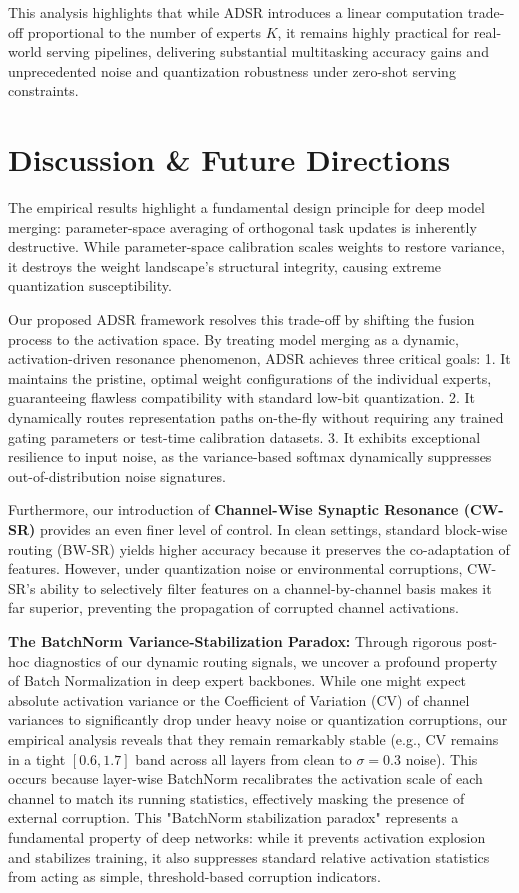 \documentclass{article}
\theoremstyle{plain}
\theoremstyle{definition}
\theoremstyle{remark}
\begin{document}
This analysis highlights that while ADSR introduces a linear computation trade-off proportional to the number of experts $K$, it remains highly practical for real-world serving pipelines, delivering substantial multitasking accuracy gains and unprecedented noise and quantization robustness under zero-shot serving constraints.

\section{Discussion \& Future Directions}
The empirical results highlight a fundamental design principle for deep model merging: parameter-space averaging of orthogonal task updates is inherently destructive. While parameter-space calibration scales weights to restore variance, it destroys the weight landscape's structural integrity, causing extreme quantization susceptibility.

Our proposed ADSR framework resolves this trade-off by shifting the fusion process to the activation space. By treating model merging as a dynamic, activation-driven resonance phenomenon, ADSR achieves three critical goals:
1. It maintains the pristine, optimal weight configurations of the individual experts, guaranteeing flawless compatibility with standard low-bit quantization.
2. It dynamically routes representation paths on-the-fly without requiring any trained gating parameters or test-time calibration datasets.
3. It exhibits exceptional resilience to input noise, as the variance-based softmax dynamically suppresses out-of-distribution noise signatures.

Furthermore, our introduction of \textbf{Channel-Wise Synaptic Resonance (CW-SR)} provides an even finer level of control. In clean settings, standard block-wise routing (BW-SR) yields higher accuracy because it preserves the co-adaptation of features. However, under quantization noise or environmental corruptions, CW-SR's ability to selectively filter features on a channel-by-channel basis makes it far superior, preventing the propagation of corrupted channel activations.

\textbf{The BatchNorm Variance-Stabilization Paradox:} Through rigorous post-hoc diagnostics of our dynamic routing signals, we uncover a profound property of Batch Normalization in deep expert backbones. While one might expect absolute activation variance or the Coefficient of Variation (CV) of channel variances to significantly drop under heavy noise or quantization corruptions, our empirical analysis reveals that they remain remarkably stable (e.g., CV remains in a tight $[0.6, 1.7]$ band across all layers from clean to $\sigma = 0.3$ noise). This occurs because layer-wise BatchNorm recalibrates the activation scale of each channel to match its running statistics, effectively masking the presence of external corruption. This "BatchNorm stabilization paradox" represents a fundamental property of deep networks: while it prevents activation explosion and stabilizes training, it also suppresses standard relative activation statistics from acting as simple, threshold-based corruption indicators.
\end{document}
